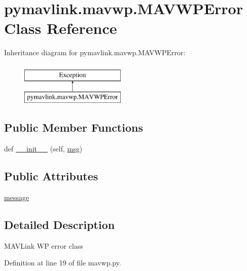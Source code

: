 \hypertarget{classpymavlink_1_1mavwp_1_1MAVWPError}{}\section{pymavlink.\+mavwp.\+M\+A\+V\+W\+P\+Error Class Reference}
\label{classpymavlink_1_1mavwp_1_1MAVWPError}
Inheritance diagram for pymavlink.\+mavwp.\+M\+A\+V\+W\+P\+Error\+:\begin{figure}[H]
\begin{center}
\leavevmode
\includegraphics[height=2.000000cm]{classpymavlink_1_1mavwp_1_1MAVWPError}
\end{center}
\end{figure}
\subsection*{Public Member Functions}
\begin{DoxyCompactItemize}
\item 
def \mbox{\hyperlink{classpymavlink_1_1mavwp_1_1MAVWPError_a721056590680e02f6b73592650d6a3a3}{\+\_\+\+\_\+init\+\_\+\+\_\+}} (self, \mbox{\hyperlink{stratnode_8cpp_a82cfe4ed9bc9e1b07c8bf209c324d85b}{msg}})
\end{DoxyCompactItemize}
\subsection*{Public Attributes}
\begin{DoxyCompactItemize}
\item 
\mbox{\hyperlink{classpymavlink_1_1mavwp_1_1MAVWPError_a8697ca92000e467cae067a8464d26625}{message}}
\end{DoxyCompactItemize}


\subsection{Detailed Description}
\begin{DoxyVerb}MAVLink WP error class\end{DoxyVerb}
 

Definition at line 19 of file mavwp.\+py.



